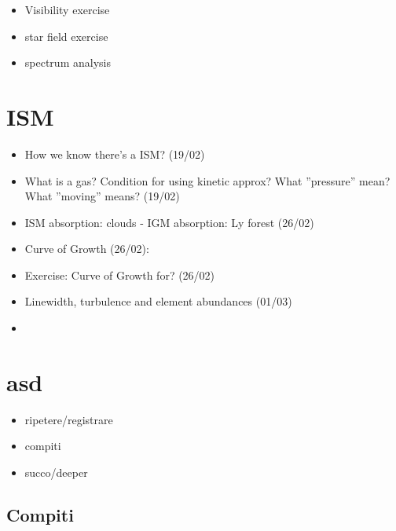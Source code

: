\documentclass[10pt,xcolor={usenames},fleqn,mathserif,serif]{beamer}
\begin{document}
\begin{itemize}
    \item Visibility exercise
    \item star field exercise
    \item spectrum analysis
\end{itemize}

\section{ISM}

\begin{itemize}
    \item How we know there's a ISM? (19/02)
    \item What is a gas? Condition for using kinetic approx? What ''pressure'' mean? What ''moving'' means? (19/02)
    \item ISM absorption: clouds - IGM absorption: Ly forest (26/02)
    \item Curve of Growth (26/02):
    \item Exercise: Curve of Growth for? (26/02)
    \item Linewidth, turbulence and element abundances (01/03)
    \item 
\end{itemize}


\section{asd}

\begin{itemize}
    \item ripetere/registrare
    \item compiti
    \item succo/deeper
\end{itemize}

\subsection{Compiti}
\end{document}
